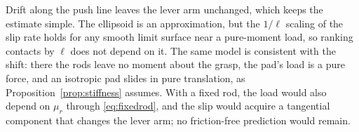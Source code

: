 Drift along the push line leaves the lever arm unchanged, which keeps the estimate simple. The ellipsoid is an approximation, but the $1/\ell$ scaling of the slip rate holds for any smooth limit surface near a pure-moment load, so ranking contacts by $\ell$ does not depend on it. The same model is consistent with the shift: there the rods leave no moment about the grasp, the pad's load is a pure force, and an isotropic pad slides in pure translation, as Proposition~\ref{prop:stiffness} assumes. With a fixed rod, the load would also depend on $\mu_r$ through \eqref{eq:fixedrod}, and the slip would acquire a tangential component that changes the lever arm; no friction-free prediction would remain.
